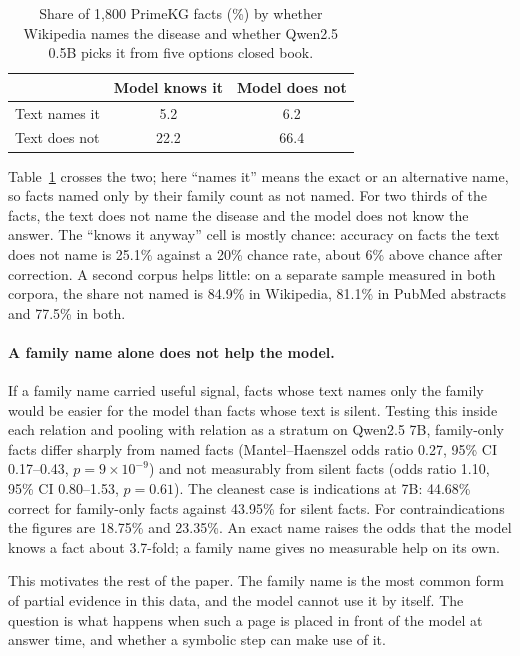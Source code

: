 \documentclass[letterpaper]{article} %
\begin{document}
\begin{table}[t]
\centering
\small
\begin{tabular}{lcc}
\toprule
 & Model knows it & Model does not \\
\midrule
Text names it & 5.2 & 6.2 \\
Text does not & 22.2 & 66.4 \\
\bottomrule
\end{tabular}
\caption{Share of 1,800 PrimeKG facts (\%) by whether Wikipedia names the
disease and whether Qwen2.5 0.5B picks it from five options closed book.}
\label{tab:boxes}
\end{table}

Table~\ref{tab:boxes} crosses the two; here ``names it'' means the exact or an
alternative name, so facts named only by their family count as not named. For
two thirds of the facts, the text does not name the disease and the model does
not know the answer. The ``knows it anyway'' cell is mostly chance: accuracy on
facts the text does not name is 25.1\% against a 20\% chance rate, about 6\%
above chance after correction. A second corpus helps little: on a separate
sample measured in both corpora, the share not named is 84.9\% in Wikipedia,
81.1\% in PubMed abstracts and 77.5\% in both.

\paragraph{A family name alone does not help the model.}
If a family name carried useful signal, facts whose text names only the family
would be easier for the model than facts whose text is silent. Testing this
inside each relation and pooling with relation as a stratum on Qwen2.5 7B,
family-only facts differ sharply from named facts (Mantel--Haenszel odds ratio
0.27, 95\% CI 0.17--0.43, $p = 9\times10^{-9}$) and not measurably from
silent facts (odds ratio 1.10, 95\% CI 0.80--1.53, $p = 0.61$). The cleanest
case is indications at 7B: 44.68\% correct for family-only facts against
43.95\% for silent facts. For contraindications the figures are 18.75\% and
23.35\%. An exact name raises the odds that the model knows a fact about
3.7-fold; a family name gives no measurable help on its own.

This motivates the rest of the paper. The family name is the most common form
of partial evidence in this data, and the model cannot use it by itself. The
question is what happens when such a page is placed in front of the model at
answer time, and whether a symbolic step can make use of it.
\end{document}
